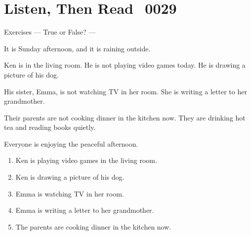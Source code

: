 \documentclass[aspectratio=169,xcolor={dvipsnames,table}]{beamer}
\newcommand{\myaudio}[1]{\href{#1}{\faVolumeUp}}
\begin{document}
\section{Listen, Then Read\,\,\,\,\,{\tiny 0029}\,{\scriptsize \myaudio{./audio/022_is_ing_negative_reading.mp3}}}
\begin{frame}[plain,t]{Exercises --- True or False? ---} 
\vspace*{-8pt}
\begin{tcolorbox}[colframe=ForestGreen, colback=NavyBlue!10!white, colbacktitle=NavyBlue!40!white,
 coltitle=black, %
 before upper={\setlength{\parindent}{1.25em}},
 title={A Quiet Sunday at Home\hfill{\tiny 0029}\quad{\scriptsize \myaudio{./audio/022_is_ing_negative_reading.mp3}}} ]
\noindent{}It is Sunday afternoon, and it is raining outside.

Ken is in the living room.
 He is not playing video games today.
He is drawing a picture of his dog.

His sister, Emma, is not watching TV in her room.
She is writing a letter to her grandmother.

Their parents are not cooking dinner in the kitchen now.
They are drinking hot tea and reading books quietly.

Everyone is enjoying the peaceful afternoon.

\end{tcolorbox}

\vspace{-7pt}

 \begin{enumerate}
\setlength{\itemsep}{-3.4pt}
 \item<2-> Ken is playing video games in the living room.\hfill{}
 \item<2-> Ken is drawing a picture of his dog.\hfill{}
 \item<2-> Emma is watching TV in her room.\hfill{}
 \item<2-> Emma is writing a letter to her grandmother.\hfill{}
 \item<2-> The parents are cooking dinner in the kitchen now.\hfill{}
 \end{enumerate}
 \end{frame}
\end{document}
